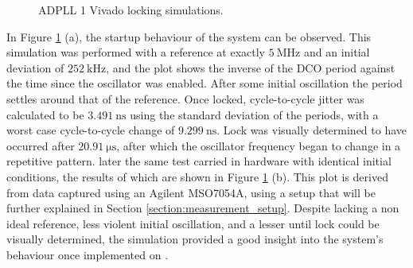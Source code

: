 \begin{figure}[h]
    \centering
    \caption[\ac{ADPLL} 1 Vivado locking simulations]{\ac{ADPLL} 1 Vivado locking simulations.}
    \label{fig:sim_locking}
\end{figure}
In Figure \ref{fig:sim_locking} (a), the startup behaviour of the system can be observed. This simulation was performed with a reference at exactly $5~\si{\mega\hertz}$ and an initial deviation of $252~\si{\kilo\hertz}$, and the plot shows the inverse of the \ac{DCO} period against the time since the oscillator was enabled. After some initial oscillation the period settles around that of the reference. Once locked, cycle-to-cycle jitter was calculated to be $3.491~\si{\nano\second}$ using the standard deviation of the periods, with a worst case cycle-to-cycle change of $9.299~\si{\nano\second}$. Lock was visually determined to have occurred after $20.91~\si{\micro\second}$, after which the oscillator frequency began to change in a repetitive pattern. later the same test carried in hardware with identical initial conditions, the results of which are shown in Figure \ref{fig:sim_locking} (b). This plot is derived from data captured using an Agilent MSO7054A, using a setup that will be further explained in Section \ref{section:measurement_setup}. Despite lacking a non ideal reference, less violent initial oscillation, and a lesser until lock could be visually determined, the simulation provided a good insight into the system's behaviour once implemented on .



